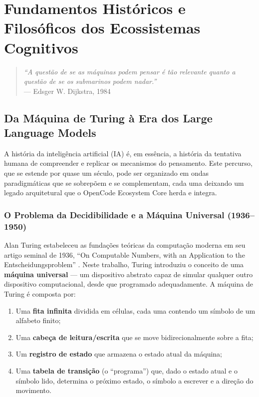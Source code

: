 
\chapter{Fundamentos Históricos e Filosóficos dos Ecossistemas Cognitivos}

\begin{quote}
\textit{``A questão de se as máquinas podem pensar é tão relevante quanto a questão de se os submarinos podem nadar.''} \\
--- Edsger W. Dijkstra, 1984
\end{quote}

\section{Da Máquina de Turing à Era dos Large Language Models}

A história da inteligência artificial (IA) é, em essência, a história da tentativa humana de compreender e replicar os mecanismos do pensamento. Este percurso, que se estende por quase um século, pode ser organizado em ondas paradigmáticas que se sobrepõem e se complementam, cada uma deixando um legado arquitetural que o OpenCode Ecosystem Core herda e integra.

\subsection{O Problema da Decidibilidade e a Máquina Universal (1936--1950)}

Alan Turing estabeleceu as fundações teóricas da computação moderna em seu artigo seminal de 1936, ``On Computable Numbers, with an Application to the Entscheidungsproblem'' \cite{turing1936computable}. Neste trabalho, Turing introduziu o conceito de uma \textbf{máquina universal} --- um dispositivo abstrato capaz de simular qualquer outro dispositivo computacional, desde que programado adequadamente. A máquina de Turing é composta por:

\begin{enumerate}
    \item Uma \textbf{fita infinita} dividida em células, cada uma contendo um símbolo de um alfabeto finito;
    \item Uma \textbf{cabeça de leitura/escrita} que se move bidirecionalmente sobre a fita;
    \item Um \textbf{registro de estado} que armazena o estado atual da máquina;
    \item Uma \textbf{tabela de transição} (o ``programa'') que, dado o estado atual e o símbolo lido, determina o próximo estado, o símbolo a escrever e a direção do movimento.
\end{enumerate}

